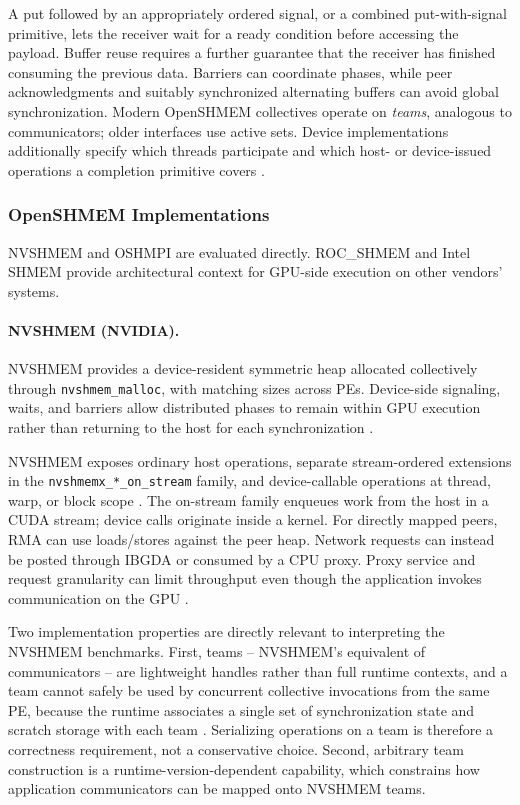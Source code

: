 A put followed by an appropriately ordered signal, or a combined put-with-signal primitive, lets the receiver wait for a ready condition before accessing the payload. Buffer reuse requires a further guarantee that the receiver has finished consuming the previous data. Barriers can coordinate phases, while peer acknowledgments and suitably synchronized alternating buffers can avoid global synchronization. Modern OpenSHMEM collectives operate on \emph{teams}, analogous to communicators; older interfaces use active sets. Device implementations additionally specify which threads participate and which host- or device-issued operations a completion primitive covers \cite{ma_demystifying_2026,ravi_unified_2026}.

\subsubsection{OpenSHMEM Implementations}

NVSHMEM and OSHMPI are evaluated directly. ROC\_SHMEM and Intel SHMEM provide architectural context for GPU-side execution on other vendors' systems.

\paragraph{NVSHMEM (NVIDIA).}
NVSHMEM \cite{nvidia_nvshmem_repo} provides a device-resident symmetric heap allocated collectively through \texttt{nvshmem\_malloc}, with matching sizes across PEs. Device-side signaling, waits, and barriers allow distributed phases to remain within GPU execution rather than returning to the host for each synchronization \cite{unat_landscape_2026}.

NVSHMEM exposes ordinary host operations, separate stream-ordered extensions in the \texttt{nvshmemx\_*\_on\_stream} family, and device-callable operations at thread, warp, or block scope \cite{ma_demystifying_2026}. The on-stream family enqueues work from the host in a CUDA stream; device calls originate inside a kernel. For directly mapped peers, RMA can use loads/stores against the peer heap. Network requests can instead be posted through IBGDA or consumed by a CPU proxy. Proxy service and request granularity can limit throughput even though the application invokes communication on the GPU \cite{unat_landscape_2026}.

Two implementation properties are directly relevant to interpreting the NVSHMEM benchmarks. First, teams -- NVSHMEM's equivalent of communicators -- are lightweight handles rather than full runtime contexts, and a team cannot safely be used by concurrent collective invocations from the same PE, because the runtime associates a single set of synchronization state and scratch storage with each team \cite{ma_demystifying_2026}. Serializing operations on a team is therefore a correctness requirement, not a conservative choice. Second, arbitrary team construction is a runtime-version-dependent capability, which constrains how application communicators can be mapped onto NVSHMEM teams.

